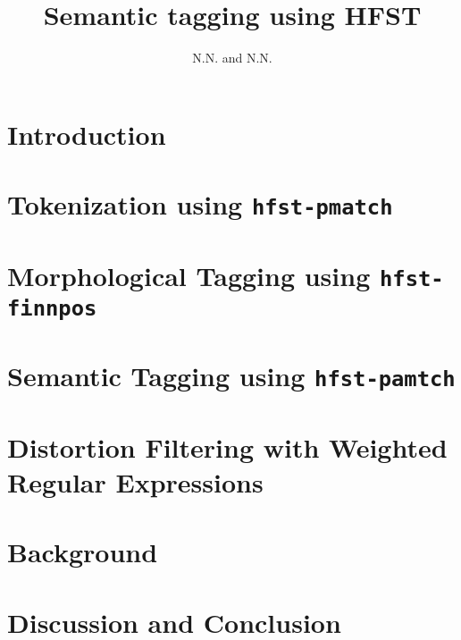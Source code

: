 \documentclass{llncs}
\begin{document}
%
\title{Semantic tagging using HFST}
%
\author{N.N. and N.N.}


\maketitle


\begin{abstract}
\end{abstract}

\section*{Introduction}

\section{Tokenization using {\tt hfst-pmatch}}\label{sec:tokenization}

\section{Morphological Tagging using {\tt hfst-finnpos}}\label{sec:morph-tagging}

\section{Semantic Tagging using {\tt hfst-pamtch}}\label{sec:sem-tagging}

\section{Distortion Filtering with Weighted Regular Expressions}

\section{Background}\label{sec:background}

\section{Discussion and Conclusion}\label{sec:discussion}



\end{document}
